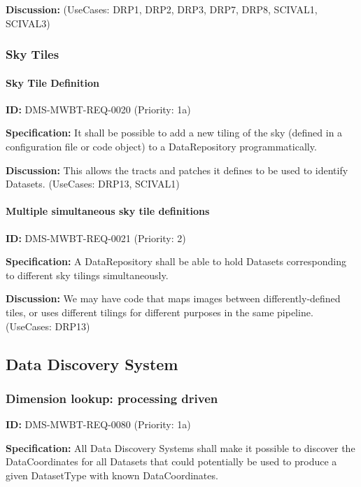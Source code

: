 \documentclass[SE,toc,lsstdraft]{lsstdoc}
\begin{document}
\textbf{Discussion:}
(UseCases: DRP1, DRP2, DRP3, DRP7, DRP8, SCIVAL1, SCIVAL3)

\subsubsection{Sky Tiles}

\paragraph{Sky Tile Definition}\hfill  %

\label{DMS-MWBT-REQ-0020}
\textbf{ID:} DMS-MWBT-REQ-0020 (Priority: 1a)

\textbf{Specification:}
It shall be possible to add a new tiling of the sky (defined in a configuration file or code object) to a DataRepository programmatically.

\textbf{Discussion:}
This allows the tracts and patches it defines to be used to identify Datasets. (UseCases: DRP13, SCIVAL1)

\paragraph{Multiple simultaneous sky tile definitions}\hfill  %

\label{DMS-MWBT-REQ-0021}
\textbf{ID:} DMS-MWBT-REQ-0021 (Priority: 2)

\textbf{Specification:}
A DataRepository shall be able to hold Datasets corresponding to different sky tilings simultaneously.

\textbf{Discussion:}
We may have code that maps images between differently-defined tiles, or uses different tilings for different purposes in the same pipeline. (UseCases: DRP13)

\subsection{Data Discovery System}

\subsubsection{Dimension lookup: processing driven}

\label{DMS-MWBT-REQ-0080}
\textbf{ID:} DMS-MWBT-REQ-0080 (Priority: 1a)

\textbf{Specification:}
All Data Discovery Systems shall make it possible to discover the DataCoordinates for all Datasets that could potentially be used to produce a given DatasetType with known DataCoordinates.
\end{document}
